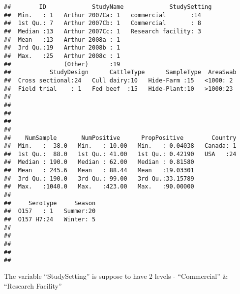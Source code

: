 \documentclass[]{article}
\newenvironment{Shaded}{\begin{snugshade}}{\end{snugshade}}
\newcommand{\KeywordTok}[1]{\textcolor[rgb]{0.13,0.29,0.53}{\textbf{#1}}}
\newcommand{\StringTok}[1]{\textcolor[rgb]{0.31,0.60,0.02}{#1}}
\newcommand{\OperatorTok}[1]{\textcolor[rgb]{0.81,0.36,0.00}{\textbf{#1}}}
\newcommand{\NormalTok}[1]{#1}
\begin{document}
\begin{verbatim}
##        ID             StudyName             StudySetting
##  Min.   : 1   Arthur 2007Ca: 1   commercial       :14   
##  1st Qu.: 7   Arthur 2007Cb: 1   Commercial       : 8   
##  Median :13   Arthur 2007Cc: 1   Research facility: 3   
##  Mean   :13   Arthur 2008a : 1                          
##  3rd Qu.:19   Arthur 2008b : 1                          
##  Max.   :25   Arthur 2008c : 1                          
##               (Other)      :19                          
##           StudyDesign      CattleType      SampleType  AreaSwab 
##  Cross sectional:24   Cull dairy:10   Hide-Farm :15   <1000: 2  
##  Field trial    : 1   Fed beef  :15   Hide-Plant:10   >1000:23  
##                                                                 
##                                                                 
##                                                                 
##                                                                 
##                                                                 
##    NumSample       NumPositive      PropPositive        Country  
##  Min.   :  38.0   Min.   : 10.00   Min.   : 0.04038   Canada: 1  
##  1st Qu.:  88.0   1st Qu.: 41.00   1st Qu.: 0.42190   USA   :24  
##  Median : 190.0   Median : 62.00   Median : 0.81580              
##  Mean   : 245.6   Mean   : 88.44   Mean   :19.03301              
##  3rd Qu.: 190.0   3rd Qu.: 99.00   3rd Qu.:33.15789              
##  Max.   :1040.0   Max.   :423.00   Max.   :90.00000              
##                                                                  
##     Serotype     Season  
##  O157   : 1   Summer:20  
##  O157 H7:24   Winter: 5  
##                          
##                          
##                          
##                          
## 
\end{verbatim}

The variable ``StudySetting'' is suppose to have 2 levels -
``Commercial'' \& ``Research Facility''

\begin{Shaded}
\end{Shaded}
\end{document}
